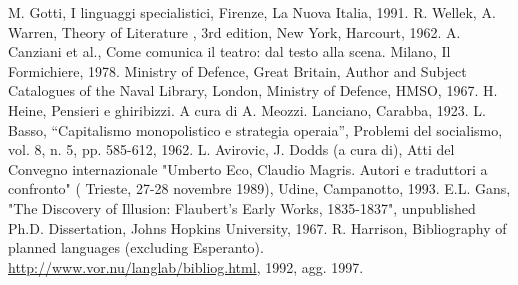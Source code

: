 \documentclass[12pt]{report}
\begin{document}
%
%

%
%
\begin{thebibliography}{00}
%
M. Gotti, I linguaggi specialistici, Firenze, La Nuova Italia, 1991.
%
R. Wellek, A. Warren, Theory of Literature , 3rd edition, New York, Harcourt, 1962.
%
A. Canziani et al., Come comunica il teatro: dal testo alla scena. Milano, Il Formichiere, 1978.
%
Ministry of Defence, Great Britain, Author and Subject Catalogues of the Naval Library, London, Ministry of Defence, HMSO, 1967.
%
H. Heine, Pensieri e ghiribizzi. A cura di A. Meozzi. Lanciano, Carabba, 1923.
%
L. Basso, ``Capitalismo monopolistico e strategia operaia'', Problemi del socialismo, vol. 8, n. 5, pp. 585-612, 1962.
%
L. Avirovic, J. Dodds (a cura di), Atti del Convegno internazionale "Umberto Eco, Claudio Magris. Autori e traduttori a confronto" ( Trieste, 27-28 novembre 1989), Udine, Campanotto, 1993.
%
E.L. Gans, "The Discovery of Illusion: Flaubert's Early Works, 1835-1837", unpublished Ph.D. Dissertation, Johns Hopkins University, 1967.
%
R. Harrison, Bibliography of planned languages (excluding Esperanto).  \url{http://www.vor.nu/langlab/bibliog.html}, 1992, agg. 1997.
%
\end{thebibliography}
% 
\end{document}
